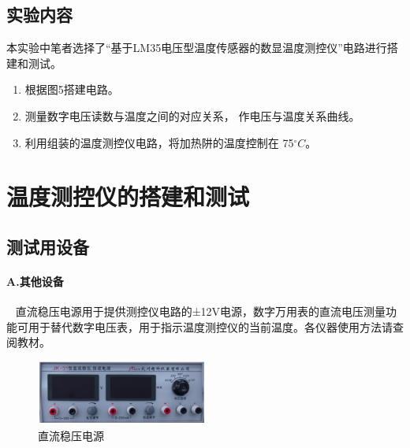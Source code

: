 \documentclass[10pt,a4paper,twocolumn,twoside,UTF8]{ctexart}
\begin{document}
	\subsection{实验内容}
	本实验中笔者选择了“基于LM35电压型温度传感器的数显温度测控仪”电路进行搭建和测试。
	\begin{enumerate}[(1)] 
		\item 根据图5搭建电路。
		\item 测量数字电压读数与温度之间的对应关系， 作电压与温度关系曲线。
	 	\item 利用组装的温度测控仪电路，将加热阱的温度控制在 75$^{\circ}C$。
	\end{enumerate}



\section{温度测控仪的搭建和测试}
	
	\subsection{测试用设备}
	\paragraph{A.其他设备}~
	\newline
	\indent 直流稳压电源用于提供测控仪电路的±12V电源，数字万用表的直流电压测量功能可用于替代数字电压表，用于指示温度测控仪的当前温度。各仪器使用方法请查阅教材。

	\begin{figure}[htbp]
		\centering
		\includegraphics[width=0.5\textwidth]{img//device_3.png}
		\caption{直流稳压电源}
		\label{powersource}
	\end{figure}
\end{document}
